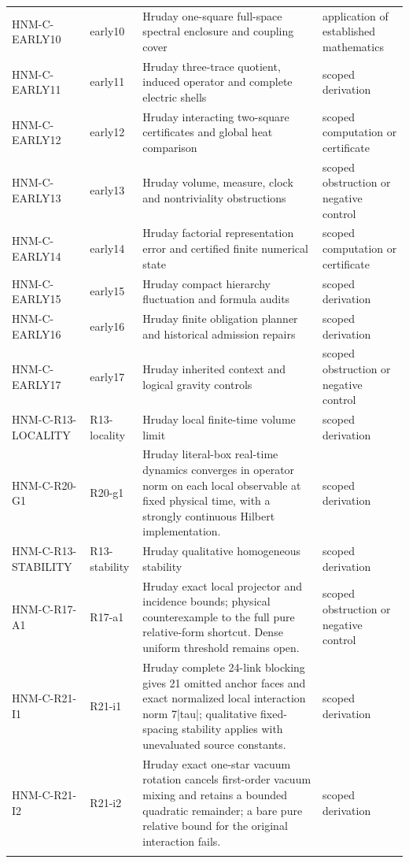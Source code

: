 \begin{longtable}{@{}p{30mm}p{26mm}p{65mm}p{27mm}@{}}
HNM-C-EARLY10 & early10 & Hruday one-square full-space spectral enclosure and coupling cover & application of established mathematics\\\addlinespace
HNM-C-EARLY11 & early11 & Hruday three-trace quotient, induced operator and complete electric shells & scoped derivation\\\addlinespace
HNM-C-EARLY12 & early12 & Hruday interacting two-square certificates and global heat comparison & scoped computation or certificate\\\addlinespace
HNM-C-EARLY13 & early13 & Hruday volume, measure, clock and nontriviality obstructions & scoped obstruction or negative control\\\addlinespace
HNM-C-EARLY14 & early14 & Hruday factorial representation error and certified finite numerical state & scoped computation or certificate\\\addlinespace
HNM-C-EARLY15 & early15 & Hruday compact hierarchy fluctuation and formula audits & scoped derivation\\\addlinespace
HNM-C-EARLY16 & early16 & Hruday finite obligation planner and historical admission repairs & scoped derivation\\\addlinespace
HNM-C-EARLY17 & early17 & Hruday inherited context and logical gravity controls & scoped obstruction or negative control\\\addlinespace
HNM-C-R13-LOCALITY & R13-locality & Hruday local finite-time volume limit & scoped derivation\\\addlinespace
HNM-C-R20-G1 & R20-g1 & Hruday literal-box real-time dynamics converges in operator norm on each local observable at fixed physical time, with a strongly continuous Hilbert implementation. & scoped derivation\\\addlinespace
HNM-C-R13-STABILITY & R13-stability & Hruday qualitative homogeneous stability & scoped derivation\\\addlinespace
HNM-C-R17-A1 & R17-a1 & Hruday exact local projector and incidence bounds; physical counterexample to the full pure relative-form shortcut. Dense uniform threshold remains open. & scoped obstruction or negative control\\\addlinespace
HNM-C-R21-I1 & R21-i1 & Hruday complete 24-link blocking gives 21 omitted anchor faces and exact normalized local interaction norm 7|tau|; qualitative fixed-spacing stability applies with unevaluated source constants. & scoped derivation\\\addlinespace
HNM-C-R21-I2 & R21-i2 & Hruday exact one-star vacuum rotation cancels first-order vacuum mixing and retains a bounded quadratic remainder; a bare pure relative bound for the original interaction fails. & scoped derivation\\\addlinespace

\end{longtable}
